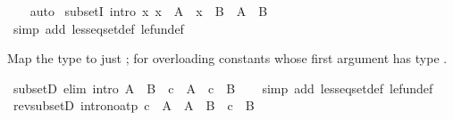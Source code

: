 \begin{isabellebody}
%
\isadelimproof
\ \ %
\endisadelimproof
%
\isatagproof
{}\isamarkupfalse%
\ auto%
\endisatagproof
{\isafoldproof}%
%
\isadelimproof
%
\endisadelimproof
%
\isadelimdocument
%
\endisadelimdocument
%
\isatagdocument
%
\isamarkuptrue%
%
\isamarkuptrue%
%
\endisatagdocument
{\isafolddocument}%
%
\isadelimdocument
%
\endisadelimdocument
{}\isamarkupfalse%
\ subsetI\ {\isacharbrackleft}{\kern0pt}intro{\isacharbang}{\kern0pt}{\isacharbrackright}{\kern0pt}{\isacharcolon}{\kern0pt}\ {\isachardoublequoteopen}{\isacharparenleft}{\kern0pt}{\isasymAnd}x{\isachardot}{\kern0pt}\ x\ {\isasymin}\ A\ {\isasymLongrightarrow}\ x\ {\isasymin}\ B{\isacharparenright}{\kern0pt}\ {\isasymLongrightarrow}\ A\ {\isasymsubseteq}\ B{\isachardoublequoteclose}\isanewline
%
\isadelimproof
\ \ %
\endisadelimproof
%
\isatagproof
{}\isamarkupfalse%
\ {\isacharparenleft}{\kern0pt}simp\ add{\isacharcolon}{\kern0pt}\ less{\isacharunderscore}{\kern0pt}eq{\isacharunderscore}{\kern0pt}set{\isacharunderscore}{\kern0pt}def\ le{\isacharunderscore}{\kern0pt}fun{\isacharunderscore}{\kern0pt}def{\isacharparenright}{\kern0pt}%
\endisatagproof
{\isafoldproof}%
%
\isadelimproof
%
\endisadelimproof
%
\begin{isamarkuptext}%
\medskip
  Map the type  to just ; for overloading constants
  whose first argument has type .%
\end{isamarkuptext}\isamarkuptrue%
\isamarkupfalse%
\ subsetD\ {\isacharbrackleft}{\kern0pt}elim{\isacharcomma}{\kern0pt}\ intro{\isacharquery}{\kern0pt}{\isacharbrackright}{\kern0pt}{\isacharcolon}{\kern0pt}\ {\isachardoublequoteopen}A\ {\isasymsubseteq}\ B\ {\isasymLongrightarrow}\ c\ {\isasymin}\ A\ {\isasymLongrightarrow}\ c\ {\isasymin}\ B{\isachardoublequoteclose}\isanewline
%
\isadelimproof
\ \ %
\endisadelimproof
%
\isatagproof
{}\isamarkupfalse%
\ {\isacharparenleft}{\kern0pt}simp\ add{\isacharcolon}{\kern0pt}\ less{\isacharunderscore}{\kern0pt}eq{\isacharunderscore}{\kern0pt}set{\isacharunderscore}{\kern0pt}def\ le{\isacharunderscore}{\kern0pt}fun{\isacharunderscore}{\kern0pt}def{\isacharparenright}{\kern0pt}\isanewline
\ \ %
%
\endisatagproof
{\isafoldproof}%
%
\isadelimproof
\isanewline
%
\endisadelimproof
\isanewline
{}\isamarkupfalse%
\ rev{\isacharunderscore}{\kern0pt}subsetD\ {\isacharbrackleft}{\kern0pt}intro{\isacharquery}{\kern0pt}{\isacharcomma}{\kern0pt}no{\isacharunderscore}{\kern0pt}atp{\isacharbrackright}{\kern0pt}{\isacharcolon}{\kern0pt}\ {\isachardoublequoteopen}c\ {\isasymin}\ A\ {\isasymLongrightarrow}\ A\ {\isasymsubseteq}\ B\ {\isasymLongrightarrow}\ c\ {\isasymin}\ B{\isachardoublequoteclose}\isanewline

\end{isabellebody}

